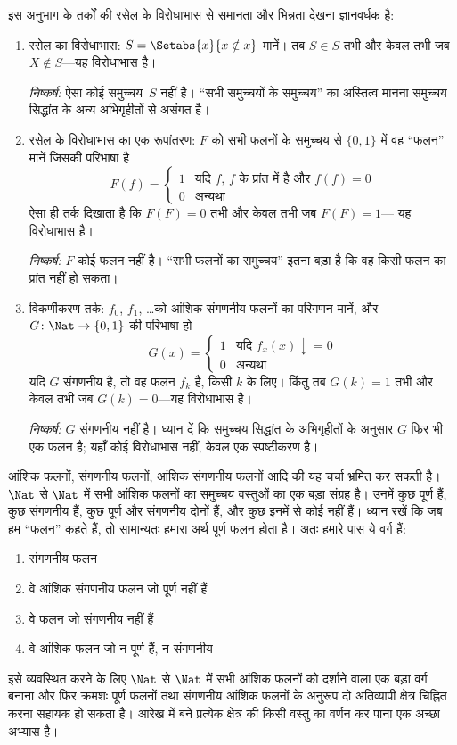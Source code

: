 \documentclass[../../../include/open-logic-section]{subfiles}
\begin{document}

इस अनुभाग के तर्कों की रसेल के विरोधाभास से समानता और भिन्नता देखना
ज्ञानवर्धक है:
\begin{enumerate}
\item रसेल का विरोधाभास: $S = \Setabs{x}{x \notin x}$ मानें। तब $S
  \in S$ तभी और केवल तभी जब $X \notin S$—यह विरोधाभास है।

  \emph{निष्कर्ष:} ऐसा कोई समुच्चय~$S$ नहीं है। ``सभी समुच्चयों के
  समुच्चय'' का अस्तित्व मानना समुच्चय सिद्धांत के अन्य अभिगृहीतों से
  असंगत है।

\item रसेल के विरोधाभास का एक रूपांतरण: $F$ को सभी फलनों के समुच्चय से
  $\{ 0, 1 \}$ में वह ``फलन'' मानें जिसकी परिभाषा है
  \[
  F(f) =
  \begin{cases}
    1 & \text{यदि $f$, $f$ के प्रांत में है और $f(f) = 0$} \\
    0 & \text{अन्यथा}
  \end{cases}
  \]
  ऐसा ही तर्क दिखाता है कि $F(F) = 0$ तभी और केवल तभी जब $F(F) = 1$—
  यह विरोधाभास है।

  \emph{निष्कर्ष:} $F$ कोई फलन नहीं है। ``सभी फलनों का समुच्चय'' इतना
  बड़ा है कि वह किसी फलन का प्रांत नहीं हो सकता।

\item विकर्णीकरण तर्क: $f_0$, $f_1$, \dots को आंशिक संगणनीय फलनों का
  परिगणन मानें, और $G \colon \Nat \to
  \{ 0, 1 \}$ की परिभाषा हो
  \[
  G(x) =
  \begin{cases}
    1 & \text{यदि $f_x(x)\downarrow = 0$} \\
    0 & \text{अन्यथा}
  \end{cases}
  \]
  यदि $G$ संगणनीय है, तो वह फलन $f_k$ है, किसी $k$ के लिए। किंतु तब
  $G(k) = 1$ तभी और केवल तभी जब $G(k) = 0$—यह विरोधाभास है।

  \emph{निष्कर्ष:} $G$ संगणनीय नहीं है। ध्यान दें कि समुच्चय सिद्धांत के
  अभिगृहीतों के अनुसार $G$ फिर भी एक फलन है; यहाँ कोई विरोधाभास नहीं,
  केवल एक स्पष्टीकरण है।
\end{enumerate}

आंशिक फलनों, संगणनीय फलनों, आंशिक संगणनीय फलनों आदि की यह चर्चा भ्रमित
कर सकती है। $\Nat$ से $\Nat$ में सभी आंशिक फलनों का समुच्चय वस्तुओं का
एक बड़ा संग्रह है। उनमें कुछ पूर्ण हैं, कुछ संगणनीय हैं, कुछ पूर्ण और
संगणनीय दोनों हैं, और कुछ इनमें से कोई नहीं हैं। ध्यान रखें कि जब हम
``फलन'' कहते हैं, तो सामान्यतः हमारा अर्थ पूर्ण फलन होता है। अतः हमारे
पास ये वर्ग हैं:
\begin{enumerate}
\item संगणनीय फलन
\item वे आंशिक संगणनीय फलन जो पूर्ण नहीं हैं
\item वे फलन जो संगणनीय नहीं हैं
\item वे आंशिक फलन जो न पूर्ण हैं, न संगणनीय
\end{enumerate}
इसे व्यवस्थित करने के लिए $\Nat$ से $\Nat$ में सभी आंशिक फलनों को
दर्शाने वाला एक बड़ा वर्ग बनाना और फिर क्रमशः पूर्ण फलनों तथा संगणनीय
आंशिक फलनों के अनुरूप दो अतिव्यापी क्षेत्र चिह्नित करना सहायक हो सकता है।
आरेख में बने प्रत्येक क्षेत्र की किसी वस्तु का वर्णन कर पाना एक अच्छा
अभ्यास है।
\end{document}
